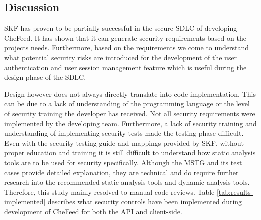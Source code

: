 \subsection{Discussion}
SKF has proven to be partially successful in the secure SDLC of developing CheFeed. It has shown that it can generate security requirements based on the projects needs. Furthermore, based on the requirements we come to understand what potential security risks are introduced for the development of the user authentication and user session management feature which is useful during the design phase of the SDLC. 

Design however does not always directly translate into code implementation. This can be due to a lack of understanding of the programming language or the level of security training the developer has received. Not all security requirements were implemented by the developing team. Furthermore, a lack of security training and understanding of implementing security tests made the testing phase difficult. Even with the security testing guide and mappings provided by SKF, without proper education and training it is still difficult to understand how static analysis tools are to be used for security specifically. Although the MSTG and its test cases provide detailed explanation, they are technical and do require further research into the recommended static analysis tools and dynamic analysis tools. Therefore, this study mainly resolved to manual code reviews. Table \ref{tab:results-implemented} describes what security controls have been implemented during development of CheFeed for both the API and client-side.


